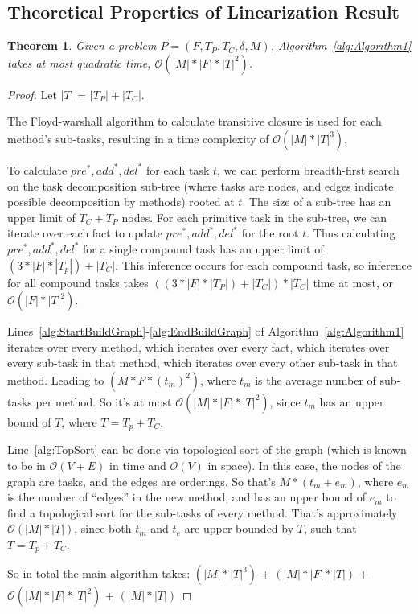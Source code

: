 \documentclass[letterpaper]{article} %
\newtheorem{theorem}{Theorem}
\newcommand{\PreS} {\ensuremath{\mathit{pre^{*}}}}
\newcommand{\AddS} {\ensuremath{\mathit{add^{*}}}}
\newcommand{\DelS} {\ensuremath{\mathit{del^{*}}}}
\begin{document}
\subsection{Theoretical Properties of Linearization Result}
\begin{theorem}\label{thm:Runtime}
	Given a problem $P = (F, T_P, T_C, \delta, M)$, Algorithm~\ref{alg:Algorithm1} takes at most quadratic time, $\mathcal{O}( |M| * |F| * |T|^2)$. 
\end{theorem}
\begin{proof}  %
	Let $|T|$ = $|T_P| + |T_C|$.
	
	The Floyd-warshall algorithm to calculate transitive closure is used for each method's sub-tasks, resulting in a time complexity of $\mathcal{O}(|M| * |T|^3)$, 
	
	
	To calculate $\PreS, \AddS, \DelS$ for each task $t$, we can perform breadth-first search on the task decomposition sub-tree (where tasks are nodes, and edges indicate possible decomposition by methods) rooted at $t$. The size of a sub-tree has an upper limit of $T_C + T_P$ nodes. For each primitive task in the sub-tree, we can iterate over each fact to update $\PreS, \AddS, \DelS$ for the root $t$. Thus calculating  $\PreS, \AddS, \DelS$ for a single compound task has an upper limit of $(3 * |F| * |T_p|) + |T_C|$. This inference occurs for each compound task, so inference for all compound tasks takes $((3 * |F| * |T_P|) + |T_C|) * |T_C|$ time at most, or $\mathcal{O}(|F| * |T|^2)$.
	
	Lines~\ref{alg:StartBuildGraph}-\ref{alg:EndBuildGraph} of Algorithm~\ref{alg:Algorithm1} iterates over every method, which iterates over every fact, which iterates over every sub-task in that method, which iterates over every other sub-task in that method. Leading to $(M * F * (t_m)^2)$, where $t_m$ is the average number of sub-tasks per method. So it's at most $\mathcal{O}(|M| * |F| * |T|^2)$, since $t_m$ has an upper bound of $T$, where $T=T_p + T_C$.		
	
	Line~\ref{alg:TopSort} can be done via topological sort of the graph (which is known to be in $\mathcal{O}(V+E)$ in time and $\mathcal{O}(V)$ in space). In this case, the nodes of the graph are tasks, and the edges are orderings. So that's $M * (t_m+e_m)$, where $e_m$ is the number of \enquote{edges} in the new method, and has an upper bound of $e_m$ to find a topological sort for the sub-tasks of every method. That's approximately $\mathcal{O}(|M| * |T|)$, since both $t_m$ and $t_e$ are upper bounded by $T$, such that $T=T_p + T_C$.
	
	So in total the main algorithm takes: \newline
	$(|M| * |T|^3)$ +          %
	$(|M| * |F| * |T|)$  +    %
	$\mathcal{O}(|M| * |F| * |T|^2)$ +  %
	$(|M| * |T|)$        %
\end{proof}
\end{document}
